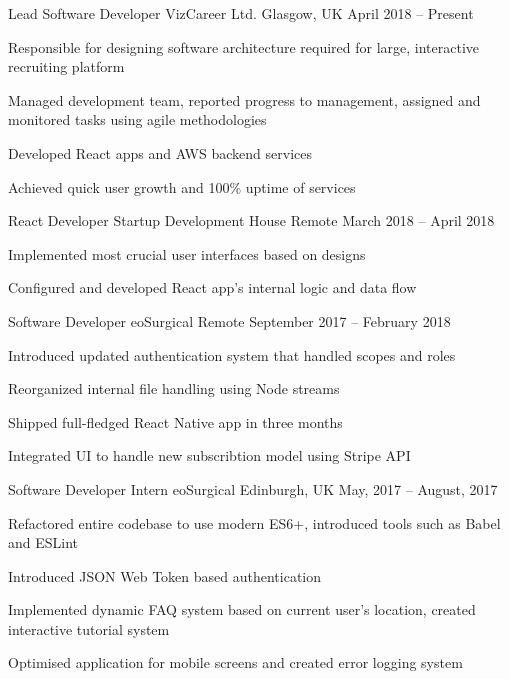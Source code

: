 \documentclass[]{awesome-cv}
\begin{document}
\vspace{-5mm}
\begin{cventries}
  \cventry
  {Lead Software Developer}
  {VizCareer Ltd.}
  {Glasgow, UK}
  {April 2018 – Present}
  {\begin{cvitems}
    \item {Responsible for designing software architecture required for large, interactive recruiting platform}
    \item {Managed development team, reported progress to management, assigned and monitored tasks using agile methodologies}
    \item {Developed React apps and AWS backend services}
    \item {Achieved quick user growth and 100\% uptime of services}
    \end{cvitems}}
	\cventry
	{React Developer}
	{Startup Development House}
	{Remote}
	{March 2018 – April 2018}
	{\begin{cvitems}
		\item {Implemented most crucial user interfaces based on designs}
    \item {Configured and developed React app's internal logic and data flow}
		\end{cvitems}}
  \cventry
  {Software Developer}
  {eoSurgical}
  {Remote}
  {September 2017 – February 2018}
  {\begin{cvitems}
    \item {Introduced updated authentication system that handled scopes and roles}
    \item {Reorganized internal file handling using Node streams}
    \item {Shipped full-fledged React Native app in three months}
    \item {Integrated UI to handle new subscribtion model using Stripe API}
    \end{cvitems}}
  \cventry
  {Software Developer Intern}
  {eoSurgical}
  {Edinburgh, UK}
  {May, 2017 – August, 2017}
  {\begin{cvitems}
    \item {Refactored entire codebase to use modern ES6+, introduced tools such as Babel and ESLint}
    \item {Introduced JSON Web Token based authentication}
    \item {Implemented dynamic FAQ system based on current user's location, created interactive tutorial system}
    \item {Optimised application for mobile screens and created error logging system}
    \end{cvitems}}
\end{cventries}
\end{document}
